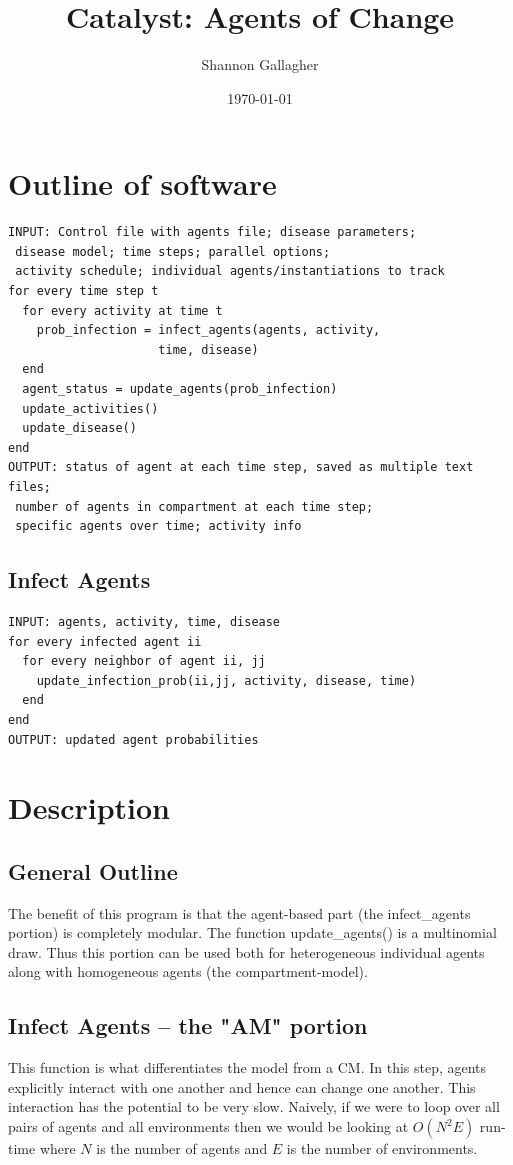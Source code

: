 \documentclass{article}
\author{Shannon Gallagher}
\date{\today}
\title{Catalyst: Agents of Change}
\begin{document}
\maketitle


\section{Outline of software}
\label{sec-1}
\begin{verbatim}
INPUT: Control file with agents file; disease parameters;
 disease model; time steps; parallel options;
 activity schedule; individual agents/instantiations to track
for every time step t
  for every activity at time t
    prob_infection = infect_agents(agents, activity, 
                     time, disease)
  end
  agent_status = update_agents(prob_infection)
  update_activities()
  update_disease()
end
OUTPUT: status of agent at each time step, saved as multiple text files;
 number of agents in compartment at each time step;
 specific agents over time; activity info
\end{verbatim}

\subsection{Infect Agents}
\label{sec-1-1}
\begin{verbatim}
INPUT: agents, activity, time, disease
for every infected agent ii
  for every neighbor of agent ii, jj
    update_infection_prob(ii,jj, activity, disease, time)
  end
end
OUTPUT: updated agent probabilities
\end{verbatim}

\section{Description}
\label{sec-2}
\subsection{General Outline}
\label{sec-2-1}


The benefit of this program is that the agent-based part (the infect\_agents portion) is completely modular.  The function update\_agents() is a multinomial draw.  Thus this portion can be used both for heterogeneous individual agents along with homogeneous agents (the compartment-model).

\subsection{Infect Agents -- the "AM" portion}
\label{sec-2-2}
This function is what differentiates the model from a CM. In this step, agents explicitly interact with one another and hence can change one another.  This interaction has the potential to be very slow.  Naively, if we were to loop over all pairs of agents and all environments then we would be looking at $O(N^2E)$ run-time where $N$ is the number of agents and $E$ is the number of environments.
\end{document}
